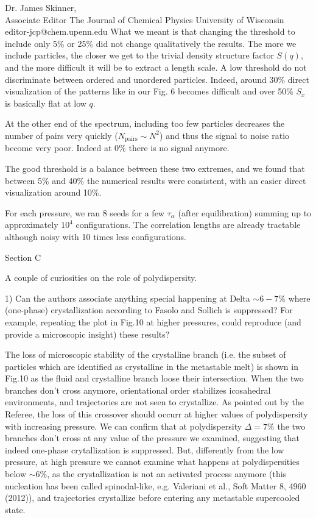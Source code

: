 \documentclass[a4paper, rebuttal, parskip=true, firsthead=false, fromemail=false, foldmarks=false]{scrlttr2}
\begin{document}
\begin{letter}{Dr. James Skinner,\\Associate Editor
The Journal of Chemical Physics
University of Wisconsin\\
editor-jcp@chem.upenn.edu }
What we meant is that changing the threshold to include only 5\% or 25\% did not change qualitatively the results. The more we include particles, the closer we get to the trivial density structure factor $S(q)$, and the more difficult it will be to extract a length scale. A low threshold do not discriminate between ordered and unordered particles. Indeed, around 30\% direct visualization of the patterns like in our Fig. 6 becomes difficult and over 50\% $S_x$ is basically flat at low $q$. 

At the other end of the spectrum, including too few particles decreases the number of pairs very quickly ($N_\text{pairs}\sim N^2$) and thus the signal to noise ratio become very poor. Indeed at 0\% there is no signal anymore.

The good threshold is a balance between these two extremes, and we found that between 5\% and 40\% the numerical results were consistent, with an easier direct visualization around 10\%.

For each pressure, we ran 8 seeds for a few $\tau_\alpha$ (after equilibration) summing up to approximately $10^4$ configurations. The correlation lengths are already tractable although noisy with 10 times less configurations.

\begin{quotationi}
Section C

A couple of curiosities on the role of polydispersity.

1) Can the authors associate anything special happening at Delta $\sim6-7\%$ where (one-phase) crystallization according to Fasolo and Sollich is suppressed? For example, repeating the plot in Fig.10 at higher pressures, could reproduce (and provide a microscopic insight) these results?
\end{quotationi}

The loss of microscopic stability of the crystalline branch (i.e. the subset of particles which are identified as crystalline in the metastable melt)
is shown in Fig.10 as the fluid and crystalline branch loose their intersection. When the two branches don't cross anymore, orientational order
stabilizes icosahedral environments, and trajectories are not seen to crystallize. As pointed out by the Referee,
the loss of this crossover should occurr at higher values of polydispersity with
increasing pressure. We can confirm that at polydispersity $\Delta=7\%$ the two branches don't cross at any value of the pressure we examined, suggesting
that indeed one-phase crytallization is suppressed. But, differently from the low pressure, at high pressure we cannot examine
what happens at polydispersities below $\sim 6\%$, as the crystallization is not an activated process anymore
(this nucleation has been called spinodal-like, e.g. Valeriani et al., Soft Matter 8, 4960 (2012)), and trajectories crystallize
before entering any metastable supercooled state.


\end{letter}
\end{document}
